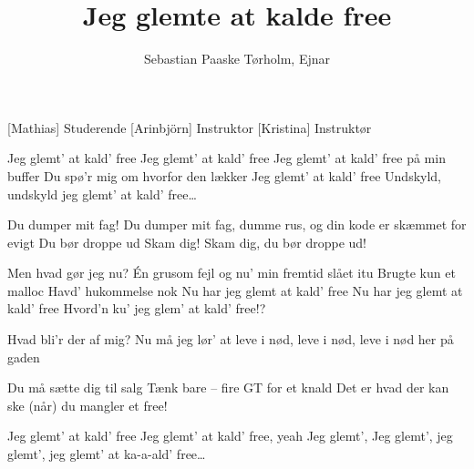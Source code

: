 \documentclass[a4paper,11pt]{article}
\title{Jeg glemte at kalde free}
\author{Sebastian Paaske Tørholm, Ejnar}
\begin{document}
\maketitle

\begin{roles}
    [Mathias] Studerende
    [Arinbjörn] Instruktor
    [Kristina] Instruktør
\end{roles}

\begin{song}
%
Jeg glemt' at kald' free
Jeg glemt' at kald' free
Jeg glemt' at kald' free på min buffer
Du spø'r mig om hvorfor den lækker
Jeg glemt' at kald' free
Undskyld, undskyld jeg glemt' at kald' free\ldots

%
Du dumper mit fag!
Du dumper mit fag, dumme rus, og
din kode er skæmmet for evigt
Du bør droppe ud
Skam dig! Skam dig, du bør droppe ud!

%
Men hvad gør jeg nu?
Én grusom fejl og nu' min fremtid slået itu
Brugte kun et malloc
Havd' hukommelse nok
Nu har jeg glemt at kald' free
Nu har jeg glemt at kald' free
Hvord'n ku' jeg glem' at kald' free!?


%
Hvad bli'r der af mig?
Nu må jeg lør' at leve i nød, leve i nød, leve i nød her på gaden

%
Du må sætte dig til salg
Tænk bare -- fire GT for et knald
Det er hvad der kan ske
(når) du mangler et free!

%
Jeg glemt' at kald' free
Jeg glemt' at kald' free, yeah
Jeg glemt', Jeg glemt', jeg glemt', jeg glemt' at ka-a-ald' free{\ldots}

\end{song}
\end{document}
